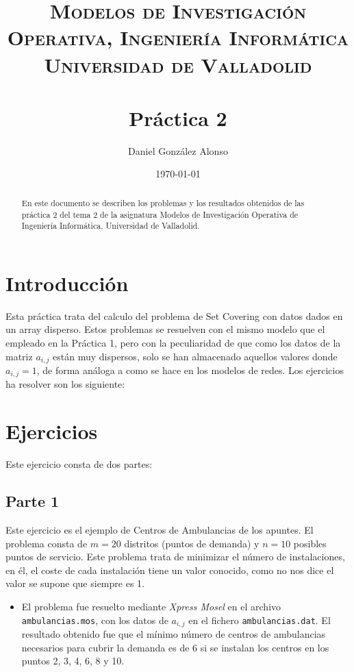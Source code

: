 \documentclass[a4paper,11pt]{article}
\title{
	\vspace{-25pt}
	\normalfont \Large \textsc{
		Modelos de Investigación Operativa,
        Ingeniería Informática\\
        Universidad de Valladolid
	}\\[10pt]
	\horrule{1pt}\\[10pt]
	\huge \textbf{
		Práctica 2
	}\\
	\horrule{1pt}
}
\author{
	\normalfont \Large Daniel González Alonso
}
\date{
	\normalfont \large \today
}
\begin{document}
\maketitle

\begin{abstract}
	En este documento se describen los problemas y los resultados obtenidos de las práctica 2 del tema 2 de la asignatura Modelos de Investigación Operativa de Ingeniería Informática, Universidad de Valladolid.
\end{abstract}

\section{Introducción}
Esta práctica trata del calculo del problema de Set Covering con datos dados en un array disperso. Estos problemas se resuelven con el mismo modelo que el empleado en la Práctica 1, pero con la peculiaridad de que como los datos de la matriz ${a_{i,j}}$ están muy dispersos, solo se han almacenado aquellos valores donde ${a_{i,j}=1}$, de forma análoga a como se hace en los modelos de redes. Los ejercicios ha resolver son los siguiente:

\section{Ejercicios}
Este ejercicio consta de dos partes:

\subsection{Parte 1}

Este ejercicio es el ejemplo de Centros de Ambulancias de los apuntes. El problema consta de ${m = 20}$ distritos (puntos de demanda) y ${n = 10}$ posibles puntos de servicio. Este problema trata de minimizar el número de instalaciones, en él, el coste de cada instalación tiene un valor conocido, como no nos dice el valor se supone que siempre es 1.

\begin{itemize}\item[]
El problema fue resuelto mediante \textit{Xpress Mosel} en el archivo \texttt{ambulancias.mos}, con los datos de ${a_{i,j}}$ en el fichero \texttt{ambulancias.dat}. El resultado obtenido fue que el mínimo número de centros de ambulancias necesarios para cubrir la demanda es de 6 si se instalan los centros en los puntos 2, 3, 4, 6, 8 y 10.
\end{itemize}
\end{document}
